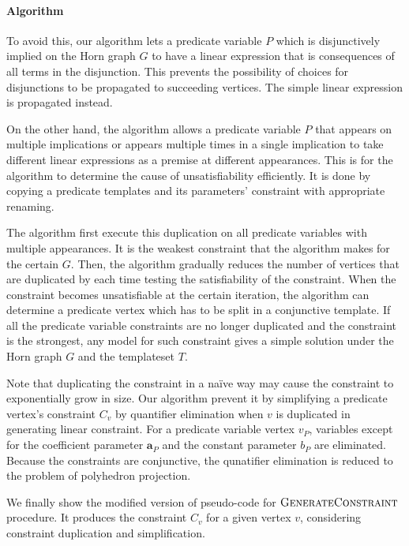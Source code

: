 \paragraph{Algorithm}
To avoid this, our algorithm lets a predicate variable $P$ which is
disjunctively implied on the Horn graph $G$ to have a linear
expression that is consequences of all terms in the disjunction.  This
prevents the possibility of choices for disjunctions to be propagated
to succeeding vertices. The simple linear expression is propagated
instead.

On the other hand, the algorithm allows a predicate variable $P$ that
appears on multiple implications or appears multiple times in a single
implication to take different linear expressions as a premise at
different appearances.  This is for the algorithm to determine the
cause of unsatisfiability efficiently.  It is done by copying a
predicate templates and its parameters' constraint with appropriate
renaming.

The algorithm first execute this duplication on all predicate
variables with multiple appearances.  It is the weakest constraint
that the algorithm makes for the certain $G$.  Then, the algorithm
gradually reduces the number of vertices that are duplicated by each
time testing the satisfiability of the constraint.  When the
constraint becomes unsatisfiable at the certain iteration, the
algorithm can determine a predicate vertex which has to be split in a
conjunctive template.  If all the predicate variable constraints are
no longer duplicated and the constraint is the strongest, any model
for such constraint gives a simple solution under the Horn graph $G$
and the templateset $T$.

Note that duplicating the constraint in a na\"{i}ve way may cause the
constraint to exponentially grow in size.  Our algorithm prevent it by
simplifying a predicate vertex's constraint $C_v$ by quantifier
elimination when $v$ is duplicated in generating linear constraint.
For a predicate variable vertex $v_P$, variables except for the
coefficient parameter $\mathbf{a}_P$ and the constant parameter $b_P$
are eliminated.  Because the constraints are conjunctive, the
qunatifier elimination is reduced to the problem of polyhedron
projection.

We finally show the modified version of pseudo-code for $\mbox{\sc GenerateConstraint}$
procedure.  It produces the constraint $C_v$ for a given vertex $v$,
considering constraint duplication and simplification.

\begin{algorithm}
\caption{$ \genConstr (G, v, V_\star) $}\label{alg:genConstr}
\begin{algorithmic}
      \ENDIF
    \ELSE
    \ENDIF
  \ENDFOR
\ENDFOR
{}
\end{algorithmic}
\end{algorithm}
